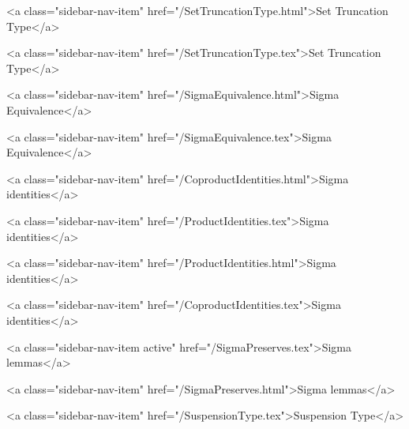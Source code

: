       
        
          <a class="sidebar-nav-item" href="/SetTruncationType.html">Set Truncation Type</a>
        
      
    
      
        
          <a class="sidebar-nav-item" href="/SetTruncationType.tex">Set Truncation Type</a>
        
      
    
      
        
          <a class="sidebar-nav-item" href="/SigmaEquivalence.html">Sigma Equivalence</a>
        
      
    
      
        
          <a class="sidebar-nav-item" href="/SigmaEquivalence.tex">Sigma Equivalence</a>
        
      
    
      
        
          <a class="sidebar-nav-item" href="/CoproductIdentities.html">Sigma identities</a>
        
      
    
      
        
          <a class="sidebar-nav-item" href="/ProductIdentities.tex">Sigma identities</a>
        
      
    
      
        
          <a class="sidebar-nav-item" href="/ProductIdentities.html">Sigma identities</a>
        
      
    
      
        
          <a class="sidebar-nav-item" href="/CoproductIdentities.tex">Sigma identities</a>
        
      
    
      
        
          <a class="sidebar-nav-item active" href="/SigmaPreserves.tex">Sigma lemmas</a>
        
      
    
      
        
          <a class="sidebar-nav-item" href="/SigmaPreserves.html">Sigma lemmas</a>
        
      
    
      
        
          <a class="sidebar-nav-item" href="/SuspensionType.tex">Suspension Type</a>
        

